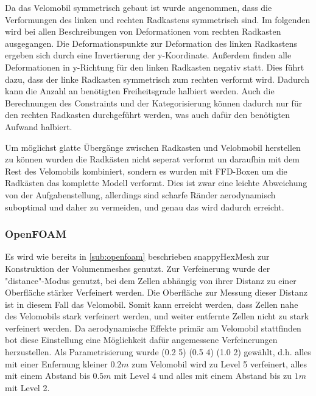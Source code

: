 Da das Velomobil symmetrisch gebaut ist wurde angenommen, dass die Verformungen des linken und rechten Radkastens symmetrisch sind.
Im folgenden wird bei allen Beschreibungen von Deformationen vom rechten Radkasten ausgegangen.
Die Deformationspunkte zur Deformation des linken Radkastens ergeben sich durch eine Invertierung der y-Koordinate.
Außerdem finden alle Deformationen in y-Richtung für den linken Radkasten negativ statt.
Dies führt dazu, dass der linke Radkasten symmetrisch zum rechten verformt wird.
Dadurch kann die Anzahl an benötigten Freiheitsgrade halbiert werden. 
Auch die Berechnungen des Constraints und der Kategorisierung können dadurch nur für den rechten Radkasten durchgeführt werden, was auch dafür den benötigten Aufwand halbiert.

Um möglichst glatte Übergänge zwischen Radkasten und Velobmobil herstellen zu können wurden die Radkästen nicht seperat verformt un daraufhin mit dem Rest des Velomobils kombiniert, sondern es wurden mit FFD-Boxen um die Radkästen das komplette Modell verformt.
Dies ist zwar eine leichte Abweichung von der Aufgabenstellung, allerdings sind scharfe Ränder aerodynamisch suboptimal und daher zu vermeiden, und genau das wird dadurch erreicht.

\subsubsection{OpenFOAM}


Es wird wie bereits in \cref{sub:openfoam} beschrieben snappyHexMesh zur Konstruktion der Volumenmeshes genutzt.
Zur Verfeinerung wurde der "distance"-Modus genutzt, bei dem Zellen abhängig von ihrer Distanz zu einer Oberfläche stärker Verfeinert werden.
Die Oberfläche zur Messung dieser Distanz ist in diesem Fall das Velomobil.
Somit kann erreicht werden, dass Zellen nahe des Velomobils stark verfeinert werden, und weiter entfernte Zellen nicht zu stark verfeinert werden.
Da aerodynamische Effekte primär am Velomobil stattfinden bot diese Einstellung eine Möglichkeit dafür angemessene Verfeinerungen herzustellen.
Als Parametrisierung wurde (0.2 5) (0.5 4) (1.0 2) gewählt, d.h. alles mit einer Enfernung kleiner $0.2m$ zum Velomobil wird zu Level 5 verfeinert, alles mit einem Abstand bis $0.5m$ mit Level 4 und alles mit einem Abstand bis zu $1m$ mit Level 2.

